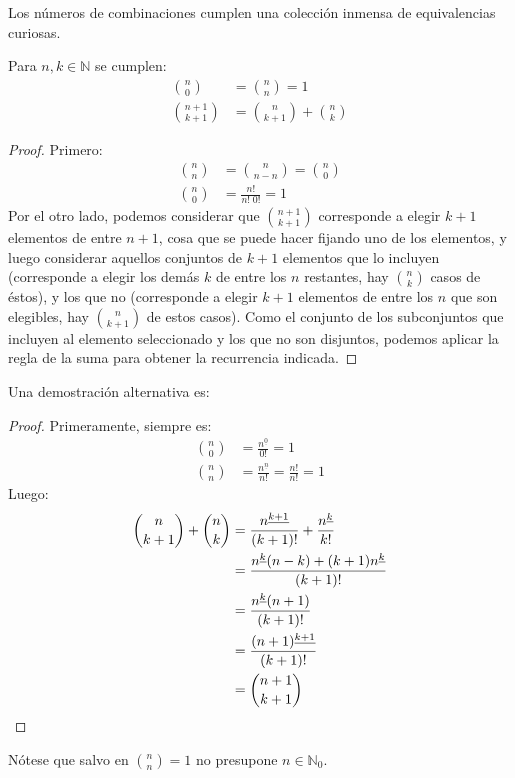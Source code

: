   Los números de combinaciones cumplen una colección inmensa
  de equivalencias curiosas.
  \begin{theorem}
    \label{theo:identidad-Pascal}
    Para \(n, k \in \mathbb{N}\) se cumplen:
    \begin{align*}
      \binom{n}{0}
	&= \binom{n}{n} = 1 \\
      \binom{n + 1}{k + 1}
	&= \binom{n}{k + 1} + \binom{n}{k}
     \end{align*}
  \end{theorem}
  \begin{proof}
    Primero:
    \begin{align*}
      \binom{n}{n}
	&= \binom{n}{n - n}
	 = \binom{n}{0} \\
      \binom{n}{0}
	&= \frac{n!}{n! \; 0!}
	 = 1
    \end{align*}
    Por el otro lado,
    podemos considerar que \(\binom{n + 1}{k + 1}\)
    corresponde a elegir \(k + 1\) elementos de entre \(n + 1\),
    cosa que se puede hacer fijando uno de los elementos,
    y luego considerar aquellos conjuntos de \(k + 1\) elementos
    que lo incluyen
    (corresponde a elegir los demás \(k\)
     de entre los \(n\) restantes,
     hay \(\binom{n}{k}\) casos de éstos),
    y los que no
    (corresponde a elegir \(k + 1\) elementos de entre los \(n\)
     que son elegibles,
     hay \(\binom{n}{k + 1}\) de estos casos).
    Como el conjunto de los subconjuntos
    que incluyen al elemento seleccionado
    y los que no son disjuntos,
    podemos aplicar la regla de la suma
    para obtener la recurrencia indicada.
  \end{proof}
  Una demostración alternativa es:
  \begin{proof}
    Primeramente,
    siempre es:
    \begin{align*}
      \binom{n}{0}
	&= \frac{n^{\underline{0}}}{0!}
	= 1 \\
      \binom{n}{n}
	&= \frac{n^{\underline{n}}}{n!}
	= \frac{n!}{n!}
	= 1
    \end{align*}
    Luego:
    \begin{align*}
      \binom{n}{k + 1} + \binom{n}{k}
	&= \frac{n^{\underline{k + 1}}}{(k + 1)!}
	     + \frac{n^{\underline{k}}}{k!} \\
	&= \frac{n^{\underline{k}} (n - k)
		   + (k + 1) n^{\underline{k}}}
		{(k + 1)!} \\
	&= \frac{n^{\underline{k}} (n + 1)}{(k + 1)!} \\
	&= \frac{(n + 1)^{\underline{k + 1}}}{(k + 1)!} \\
	&= \binom{n + 1}{k + 1}
      \qedhere
    \end{align*}
  \end{proof}
  \noindent
  Nótese que salvo en \(\binom{n}{n} = 1\)
  no presupone \(n \in \mathbb{N}_0\).

